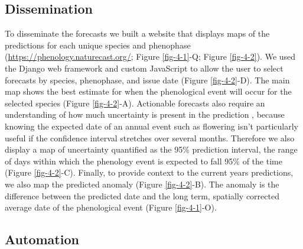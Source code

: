\subsection{Dissemination}

To disseminate the forecasts we built a website that displays maps of the predictions for each unique species and phenophase (\href{https://phenology.naturecast.org/}{https://phenology.naturecast.org/}; Figure \ref{fig-4-1}-Q; Figure \ref{fig-4-2}). We used the Django web framework and custom JavaScript to allow the user to select forecasts by species, phenophase, and issue date (Figure \ref{fig-4-2}-D). The main map shows the best estimate for when the phenological event will occur for the selected species (Figure \ref{fig-4-2}-A). Actionable forecasts also require an understanding of how much uncertainty is present in the prediction \citep{dietze2018}, because knowing the expected date of an annual event such as flowering isn’t particularly useful if the confidence interval stretches over several months. Therefore we also display a map of uncertainty quantified as the 95\% prediction interval, the range of days within which the phenology event is expected to fall 95\% of the time (Figure \ref{fig-4-2}-C). Finally, to provide context to the current years predictions, we also map the predicted anomaly (Figure \ref{fig-4-2}-B). The anomaly is the difference between the predicted date and the long term, spatially corrected average date of the phenological event (Figure \ref{fig-4-1}-O). 

\subsection{Automation}

